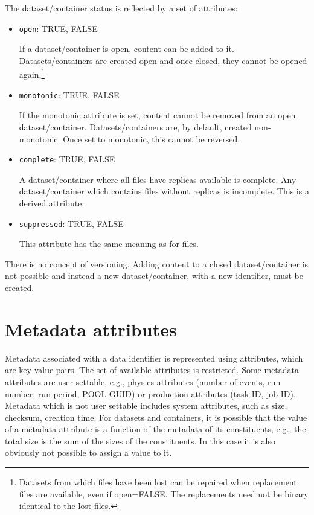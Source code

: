 \documentclass{atlasnote}
\begin{document}
\label{sec:status}
The dataset/container status is reflected by a set of attributes:

\begin{itemize}
\item{} \texttt{open}: TRUE, FALSE

If a dataset/container is open, content can be added to it. Datasets/containers are created open and once closed, they cannot be opened again.\footnote{Datasets from which files have been lost can be repaired when replacement files are available, even if open=FALSE. The replacements need not be binary identical to the lost files.}

\item{} \texttt{monotonic}: TRUE, FALSE

If the monotonic attribute is set, content cannot be removed from an open dataset/container. Datasets/containers are, by default, created non-monotonic. Once set to monotonic, this cannot be reversed.

\item{} \texttt{complete}: TRUE, FALSE

A dataset/container where all files have replicas available is complete. Any dataset/container which contains files without replicas is incomplete. This is a derived attribute.

\item{} \texttt{suppressed}: TRUE, FALSE

This attribute has the same meaning as for files.
\end{itemize}

\noindent There is no concept of versioning. Adding content to a closed dataset/container is not possible and instead a new dataset/container, with a new identifier, must be created.

\section{Metadata attributes}

Metadata associated with a data identifier is represented using attributes, which are key-value pairs. The set of available attributes is restricted. Some metadata attributes are user settable, e.g., physics attributes (number of events, run number, run period, POOL GUID) or production attributes (task ID, job ID). Metadata which is not user settable includes system attributes, such as size, checksum, creation time. For datasets and containers, it is possible that the value of a metadata attribute is a function of the metadata of its constituents, e.g., the total size is the sum of the sizes of the constituents. In this case it is also obviously not possible to assign a value to it.
\end{document}
